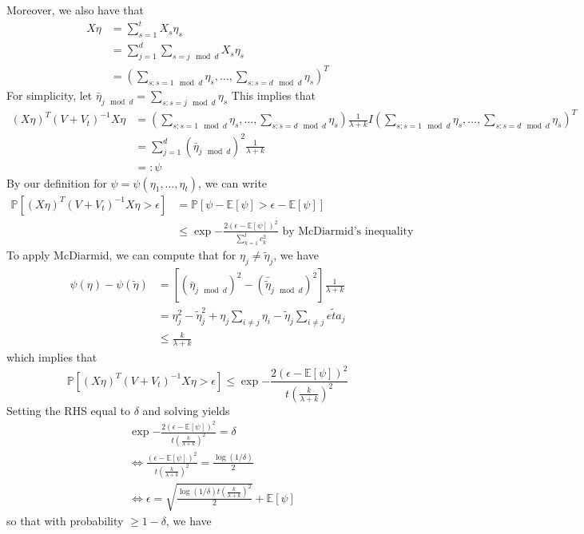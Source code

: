 \documentclass[10pt]{article}
\theoremstyle{plain}%
\theoremstyle{definition}
\newcommand{\<}{\langle}
\renewcommand{\>}{\rangle}
\renewcommand{\[}{\left[}
\renewcommand{\]}{\right]}
\renewcommand{\(}{\left(}
\renewcommand{\)}{\right)}
\newcommand{\eps}{\epsilon}
\renewcommand{\d}{\delta}
\newcommand{\E}{\mathbb{E}}
\renewcommand{\P}{\mathbb{P}}
\begin{document}
Moreover, we also have that 
\begin{align*}
  X \eta 
&= \sum_{s=1}^t X_s \eta_s    \\
&= \sum_{j=1}^d \sum_{s = j \mod d} X_s \eta_s \\
&= (\sum_{s : s = 1 \mod d} \eta_s, \ldots, \sum_{s : s = d \mod d} \eta_s)^T
\end{align*}
For simplicity, let $\bar{\eta}_{j\mod d} = \sum_{s:s = j\mod d} \eta_s$
This implies that 
\begin{align*}
(X\eta)^T (V+V_t)^{-1}X\eta
&= \left(\sum_{s : s = 1 \mod d} \eta_s, \ldots, \sum_{s : s = d \mod d} \eta_s\right) \frac{1}{\lambda + k} I 
\left(\sum_{s : s = 1 \mod d} \eta_s, \ldots, \sum_{s : s = d \mod d} \eta_s\right)^T \\
&= \sum_{j=1}^d (\bar{\eta}_{j\mod d})^2 \frac{1}{\lambda + k}\\
&=: \psi
\end{align*}
By our definition for $\psi = \psi(\eta_1,\ldots,\eta_t)$, we can write
\begin{align*}
 \P[(X\eta)^T (V+V_t)^{-1}X\eta > \eps]
&= \P[\psi - \E[\psi] > \eps - \E[\psi]]\\
&\leq \exp{-\frac{2(\eps - \E[\psi])^2}{\sum_{k=1}^t c_k^2}} \text{ by McDiarmid's inequality}
\end{align*}
To apply McDiarmid, we can compute that for $\eta_j \neq \tilde{\eta}_j$, we have
\begin{align*}
 \psi(\eta) - \psi(\tilde{\eta})
&= [ (\bar{\eta}_{j \mod d})^2 - (\bar{\tilde{\eta}}_{j \mod d})^2] \frac{1}{\lambda + k}\\
&= \eta_j^2 - \tilde{\eta}_j^2 + \eta_j \sum_{i \neq j} \eta_i - \tilde{\eta}_j \sum_{i\neq j} \tilde{eta}_j\\
&\leq \frac{k}{\lambda + k} 
\end{align*}
which implies that
$$ \P[(X\eta)^T (V+V_t)^{-1}X\eta > \eps] \leq \exp{-\frac{2(\eps - \E[\psi])^2}{t\left(\frac{k}{\lambda + k}\right)^2}}$$
Setting the RHS equal to $\delta$ and solving yields
\begin{align*}
 &\exp{-\frac{2(\eps - \E[\psi])^2}{t\left(\frac{k}{\lambda + k}\right)^2}} = \delta \\
&\Leftrightarrow \frac{(\eps - \E[\psi])^2}{t\left(\frac{k}{\lambda + k}\right)^2} = \frac{\log(1/\delta)}{2} \\
&\Leftrightarrow \eps = \sqrt{\frac{\log(1/\d) t \left(\frac{k}{\lambda + k}\right)^2}{2}} + \E[\psi]
\end{align*}
so that with probability $\geq 1- \d$, we have
\end{document}
